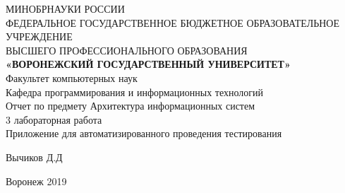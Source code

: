\documentclass{article}
\begin{document}
    \begin{center}
    \hfill \break
    \large{МИНОБРНАУКИ РОССИИ}\\
    \footnotesize{ФЕДЕРАЛЬНОЕ ГОСУДАРСТВЕННОЕ БЮДЖЕТНОЕ ОБРАЗОВАТЕЛЬНОЕ УЧРЕЖДЕНИЕ}\\
    \footnotesize{ВЫСШЕГО ПРОФЕССИОНАЛЬНОГО ОБРАЗОВАНИЯ}\\
    \small{\textbf{«ВОРОНЕЖСКИЙ ГОСУДАРСТВЕННЫЙ УНИВЕРСИТЕТ»}}\\
    \hfill \break
    \normalsize{Факультет компьютерных наук}\\
    \hfill \break
    \normalsize{Кафедра программирования и информационных технологий}\\
    \hfill\break
    \hfill \break
    \hfill \break
    \hfill \break
    \large{Отчет по предмету Архитектура информационных систем
    \\3 лабораторная работа
    \\Приложение для автоматизированного проведения тестирования}\\
    \end{center}

    \hfill \break
    \hfill \break
    \hfill \break
    \hfill \break
    \hfill \break

    \begin{flushright} Вычиков Д.Д \end{flushright}
    \vspace*{\fill}
    \begin{center} Воронеж 2019 \end{center}
    \thispagestyle{empty}
    \newpage

    \tableofcontents

    
    
\end{document}
